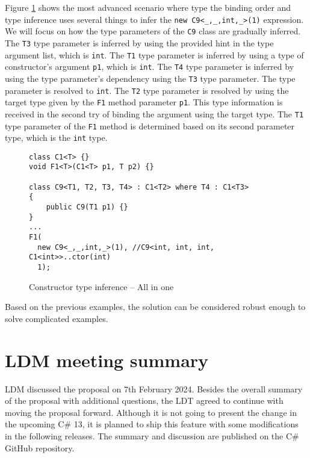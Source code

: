 \par
Figure \ref{img79:example7} shows the most advanced scenario where type the binding order and type inference uses several things to infer the \texttt{new C9<\_,\_,int,\_>(1)} expression. 
We will focus on how the type parameters of the \texttt{C9} class are gradually inferred. 
The \texttt{T3} type parameter is inferred by using the provided hint in the type argument list, which is \texttt{int}. 
The \texttt{T1} type parameter is inferred by using a type of constructor’s argument \texttt{p1}, which is \texttt{int}.
The \texttt{T4} type parameter is inferred by using the type parameter’s dependency using the \texttt{T3} type parameter. 
The type parameter is resolved to \texttt{int}. 
The \texttt{T2} type parameter is resolved by using the target type given by the \texttt{F1} method parameter \texttt{p1}. 
This type information is received in the second try of binding the argument using the target type. 
The \texttt{T1} type parameter of the \texttt{F1} method is determined based on its second parameter type, which is the \texttt{int} type.
\begin{figure}[h]
\begin{lstlisting}[style=csharp, showstringspaces=false]
class C1<T> {}
void F1<T>(C1<T> p1, T p2) {}

class C9<T1, T2, T3, T4> : C1<T2> where T4 : C1<T3>
{
    public C9(T1 p1) {}
}
...
F1(
  new C9<_,_,int,_>(1), //C9<int, int, int, C1<int>>..ctor(int)
  1);
\end{lstlisting}
\caption{Constructor type inference -- All in one}
\label{img79:example7}
\end{figure}
\par
Based on the previous examples, the solution can be considered robust enough to solve complicated examples.

\newpage

\section{LDM meeting summary}

\ac{LDM} discussed the proposal on 7th February 2024. 
Besides the overall summary of the proposal with additional questions, the \ac{LDT} agreed to continue with moving the proposal forward. 
Although it is not going to present the change in the upcoming C\# 13, it is planned to ship this feature with some modifications in the following releases. 
The summary \cite{online:mettingSummary} and discussion \cite{online:mettingSummaryDisc} are published on the C\# GitHub repository.